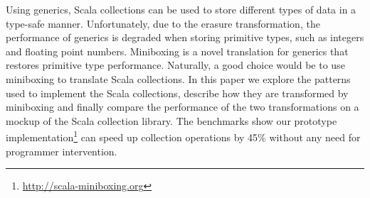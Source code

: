 Using generics, Scala collections can be used to store different types of data in a type-safe manner. Unfortunately, due to the erasure transformation, the performance of generics is degraded when storing primitive types, such as integers and floating point numbers. Miniboxing \cite{miniboxing} is a novel translation for generics that restores primitive type performance. Naturally, a good choice would be to use miniboxing to translate Scala collections. In this paper we explore the patterns used to implement the Scala collections, describe how they are transformed by miniboxing and finally compare the performance of the two transformations on a mockup of the Scala collection library. The benchmarks show our prototype implementation\footnote{\url{http://scala-miniboxing.org}} can speed up collection operations by 45\% without any need for programmer intervention.
